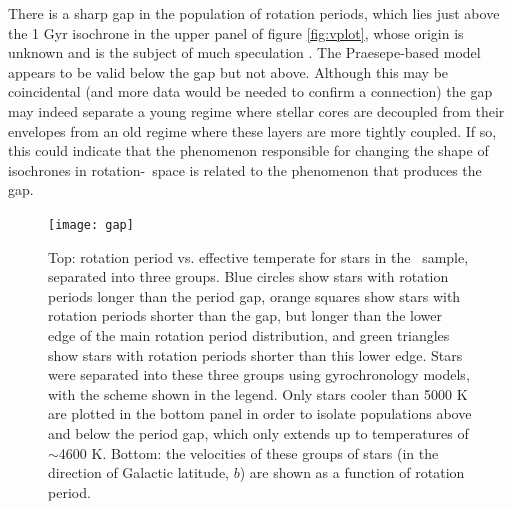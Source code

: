 There is a sharp gap in the population of rotation periods, which lies just
above the 1 Gyr isochrone in the upper panel of figure \ref{fig:vplot}, whose
origin is unknown and is the subject of much speculation \citep{mcquillan2014,
davenport2018, reinhold2019}.
The Praesepe-based model appears to be valid below the gap but not above.
Although this may be coincidental (and more data would be needed to confirm a
connection) the gap may indeed separate a young regime where stellar cores are
decoupled from their envelopes from an old regime where these layers are more
tightly coupled.
If so, this could indicate that the phenomenon responsible for changing the
shape of isochrones in rotation-\teff\ space is related to the phenomenon that
produces the gap.

\begin{figure}
  \caption{
      Top: rotation period vs. effective temperate for stars in the \mct\
    sample, separated into three groups. Blue circles
      show stars with rotation periods longer than the
    period gap, orange squares show stars with rotation periods shorter than
    the gap, but longer than the lower edge of the main rotation period
    distribution, and green triangles show stars with rotation periods shorter
    than this lower edge.
    Stars were separated into these three groups using \citet{angus2019}
    gyrochronology models, with the scheme shown in the legend.
    Only stars cooler than 5000 K are plotted in
    the bottom panel in order to isolate populations above and below the
    period gap, which only extends up to temperatures of $\sim$4600 K.
    Bottom: the velocities of these groups of stars (in the direction of
    Galactic latitude, $b$) are shown as a function of rotation period.
}
  \centering
    \texttt{[image: gap]}
\label{fig:gap}
\end{figure}

